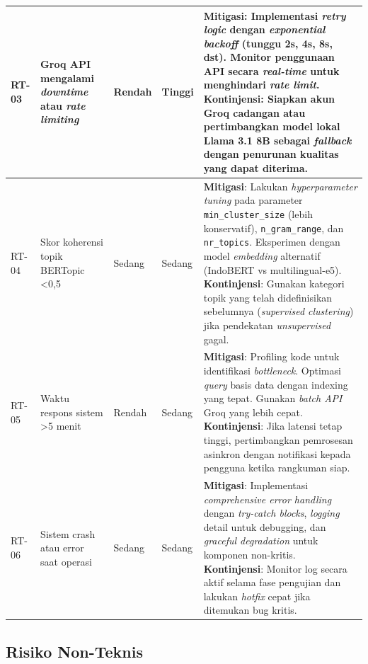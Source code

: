 \begin{longtable}{|p{1cm}|p{3.5cm}|p{2cm}|p{2cm}|p{5cm}|}
RT-03 & Groq API mengalami \textit{downtime} atau \textit{rate limiting} & Rendah & Tinggi & \textbf{Mitigasi}: Implementasi \textit{retry logic} dengan \textit{exponential backoff} (tunggu 2s, 4s, 8s, dst). Monitor penggunaan API secara \textit{real-time} untuk menghindari \textit{rate limit}. \textbf{Kontinjensi}: Siapkan akun Groq cadangan atau pertimbangkan model lokal Llama 3.1 8B sebagai \textit{fallback} dengan penurunan kualitas yang dapat diterima. \\
\hline

RT-04 & Skor koherensi topik BERTopic <0,5 & Sedang & Sedang & \textbf{Mitigasi}: Lakukan \textit{hyperparameter tuning} pada parameter \texttt{min\_cluster\_size} (lebih konservatif), \texttt{n\_gram\_range}, dan \texttt{nr\_topics}. Eksperimen dengan model \textit{embedding} alternatif (IndoBERT vs multilingual-e5). \textbf{Kontinjensi}: Gunakan kategori topik yang telah didefinisikan sebelumnya (\textit{supervised clustering}) jika pendekatan \textit{unsupervised} gagal. \\
\hline

RT-05 & Waktu respons sistem >5 menit & Rendah & Sedang & \textbf{Mitigasi}: Profiling kode untuk identifikasi \textit{bottleneck}. Optimasi \textit{query} basis data dengan indexing yang tepat. Gunakan \textit{batch API} Groq yang lebih cepat. \textbf{Kontinjensi}: Jika latensi tetap tinggi, pertimbangkan pemrosesan asinkron dengan notifikasi kepada pengguna ketika rangkuman siap. \\
\hline

RT-06 & Sistem crash atau error saat operasi & Sedang & Sedang & \textbf{Mitigasi}: Implementasi \textit{comprehensive error handling} dengan \textit{try-catch blocks}, \textit{logging} detail untuk debugging, dan \textit{graceful degradation} untuk komponen non-kritis. \textbf{Kontinjensi}: Monitor log secara aktif selama fase pengujian dan lakukan \textit{hotfix} cepat jika ditemukan bug kritis. \\
\hline
\end{longtable}

\subsection{Risiko Non-Teknis}

